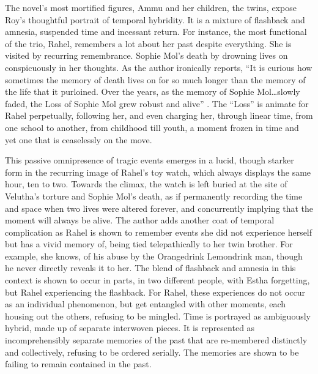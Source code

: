 The novel's most mortified figures, Ammu and her children, the twins, expose Roy's thoughtful portrait of temporal hybridity. It is a mixture of flashback and amnesia, suspended time and incessant return.  For instance,  the most functional of the trio, Rahel, remembers a lot about her past despite everything. She is visited by recurring remembrance. Sophie Mol's death by drowning lives on conspicuously in her thoughts. As the author ironically reports, ``It is curious how sometimes the memory of death lives on for so much longer than the memory of the life that it purloined. Over the years, as the memory of Sophie Mol\ldots slowly faded, the Loss of Sophie Mol grew robust and alive'' \parencite[17]{Roy1997}. The ``Loss'' is animate for Rahel perpetually, following her, and even charging her, through linear time, from one school to another, from childhood till youth, a moment frozen in time and yet one that is ceaselessly on the move. 

This passive omnipresence of tragic events emerges in a lucid, though starker form in the recurring image of Rahel's toy watch, which always displays the same hour, ten to two. Towards the climax, the watch is left buried at the site of Velutha's torture and Sophie Mol's death, as if permanently recording the time and space when two lives were altered forever, and concurrently implying that the moment will always be alive. The author adds another coat of temporal complication as Rahel is shown to remember events she did not experience herself but has a vivid memory of, being tied telepathically to her twin brother. For example, she knows, of his abuse by the Orangedrink Lemondrink man, though he never directly reveals it to her. The blend of flashback and amnesia in this context is shown to occur in parts, in two different people, with Estha forgetting, but Rahel experiencing the flashback. For Rahel, these experiences do not occur as an individual phenomenon, but get entangled with other moments, each housing out the others, refusing to be mingled. Time is portrayed as ambiguously hybrid, made up of separate interwoven pieces. It is represented as incomprehensibly separate memories of the past that are re-membered distinctly and collectively, refusing to be ordered serially.  The memories are shown to be failing to remain contained in the past. 


